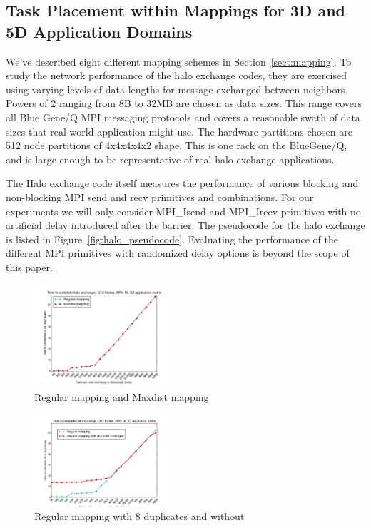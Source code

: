 \documentclass{acm_proc_article-sp}
\begin{document}
\subsection{Task Placement within Mappings for 3D and 5D Application Domains}
We've described eight different mapping schemes in Section~\ref{sect:mapping}.
To study the network performance of the halo exchange codes, they are exercised using varying levels of data lengths for message exchanged between neighbors.
Powers of 2 ranging from 8B to 32MB are chosen as data sizes.  This range
covers all Blue Gene/Q MPI messaging protocols and covers
a reasonable swath of data sizes that real world application might use. The hardware partitions chosen are 512 node partitions of 4x4x4x4x2 shape. This
is one rack on the BlueGene/Q, and is large enough to be representative of
real halo exchange applications.

The Halo exchange code itself measures the performance of various blocking and non-blocking MPI send and recv primitives and combinations.
For our experiments we will only consider MPI\_Isend and MPI\_Irecv primitives with no artificial delay introduced after the barrier.
The pseudocode for the halo exchange is listed in Figure~\ref{fig:halo_pseudocode}.
Evaluating the performance of the different MPI primitives with randomized delay options is beyond the scope of this paper.


\begin{figure}
  \center
  \includegraphics[width=0.45\textwidth]{regular_vs_maxdist.png}
  \caption{Regular mapping and Maxdist mapping}
    \label{fig:regular_vs_maxdist}
\end{figure}


\begin{figure}
  \center
  \includegraphics[width=0.45\textwidth]{regular_vs_cache_duplicates.png}
  \caption{Regular mapping with 8 duplicates and without}
    \label{fig:caching_figure_vs_without}
\end{figure}
\end{document}
